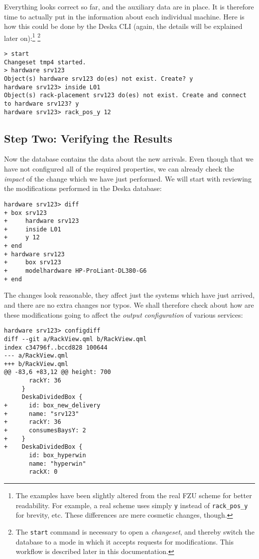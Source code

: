 \documentclass[deska]{subfiles}
\begin{document}
Everything looks correct so far, and the auxiliary data are in place.  It is therefore time to actually put in the
information about each individual machine.  Here is how this could be done by the Deska CLI (again, the details will be
explained later on):\footnote{The examples have been slightly altered from the real FZU scheme for better readability.
For example, a real scheme uses simply {\tt y} instead of {\tt rack\_pos\_y} for brevity, etc.  These differences are
mere cosmetic changes, though.} \footnote{The {\tt start} command is necessary to open a {\em changeset}, and thereby
switch the database to a mode in which it accepts requests for modifications.  This workflow is described later in this
documentation.}

\begin{verbatim}
> start
Changeset tmp4 started.
> hardware srv123
Object(s) hardware srv123 do(es) not exist. Create? y
hardware srv123> inside L01
Object(s) rack-placement srv123 do(es) not exist. Create and connect to hardware srv123? y
hardware srv123> rack_pos_y 12
\end{verbatim}

\subsection{Step Two: Verifying the Results}

Now the database contains the data about the new arrivals.  Even though that we have not configured all of the required
properties, we can already check the {\em impact} of the change which we have just performed.  We will start with
reviewing the modifications performed in the Deska database:

\begin{verbatim}
hardware srv123> diff
+ box srv123
+     hardware srv123
+     inside L01
+     y 12
+ end
+ hardware srv123
+     box srv123
+     modelhardware HP-ProLiant-DL380-G6
+ end
\end{verbatim}

The changes look reasonable, they affect just the systems which have just arrived, and there are no extra changes nor
typos.  We shall therefore check about how are these modifications going to affect the {\em output configuration} of
various services:

\begin{verbatim}
hardware srv123> configdiff
diff --git a/RackView.qml b/RackView.qml
index c34796f..bccd828 100644
--- a/RackView.qml
+++ b/RackView.qml
@@ -83,6 +83,12 @@ height: 700
       rackY: 36
     }
     DeskaDividedBox {
+      id: box_new_delivery
+      name: "srv123"
+      rackY: 36
+      consumesBaysY: 2
+    }
+    DeskaDividedBox {
       id: box_hyperwin
       name: "hyperwin"
       rackX: 0
\end{verbatim}
\end{document}

